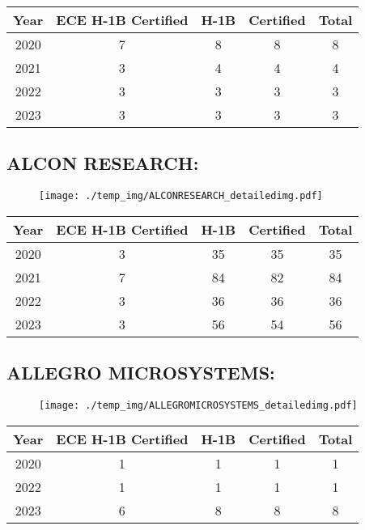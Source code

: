 \documentclass{article}%
\begin{document}
%
\begin{longtable}{c|c|c|c|c}%
\hline%
Year&ECE H{-}1B Certified&H{-}1B&Certified&Total\\%
\hline%
2020&7&8&8&8\\%
\hline%
2021&3&4&4&4\\%
\hline%
2022&3&3&3&3\\%
\hline%
2023&3&3&3&3\\%
\hline%
\end{longtable}

%
\newpage%
\subsection{ALCON RESEARCH:}%
\label{subsec:ALCONRESEARCH}%
\label{ALCONRESEARCHdetailed}%


\begin{figure}[htbp]%
\centering%
\texttt{[image: ./temp\_img/ALCONRESEARCH\_detailedimg.pdf]}%
\end{figure}

%
\begin{longtable}{c|c|c|c|c}%
\hline%
Year&ECE H{-}1B Certified&H{-}1B&Certified&Total\\%
\hline%
2020&3&35&35&35\\%
\hline%
2021&7&84&82&84\\%
\hline%
2022&3&36&36&36\\%
\hline%
2023&3&56&54&56\\%
\hline%
\end{longtable}

%
\newpage%
\subsection{ALLEGRO MICROSYSTEMS:}%
\label{subsec:ALLEGROMICROSYSTEMS}%
\label{ALLEGROMICROSYSTEMSdetailed}%


\begin{figure}[htbp]%
\centering%
\texttt{[image: ./temp\_img/ALLEGROMICROSYSTEMS\_detailedimg.pdf]}%
\end{figure}

%
\begin{longtable}{c|c|c|c|c}%
\hline%
Year&ECE H{-}1B Certified&H{-}1B&Certified&Total\\%
\hline%
2020&1&1&1&1\\%
\hline%
2022&1&1&1&1\\%
\hline%
2023&6&8&8&8\\%
\hline%
\end{longtable}
\end{document}
